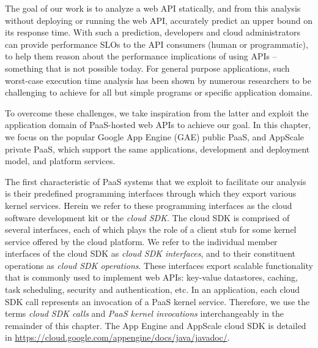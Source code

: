 The goal of our work is to analyze a web API statically, and from this analysis 
without deploying or running the web API, 
accurately predict an upper bound on its response time. With such a prediction,
developers and cloud administrators can provide performance SLOs to the API consumers (human or 
programmatic), to help them reason about 
the performance implications of using APIs -- something that is not possible today.
For general purpose applications, such worst-case execution time analysis has been shown
by numerous researchers to be challenging to achieve for all but 
simple programs or specific application domains.

To overcome these challenges, we take inspiration from the latter and exploit 
the application domain of PaaS-hosted web APIs to achieve our goal.  
In this chapter, we focus on the popular Google App Engine (GAE) public PaaS, 
and AppScale private PaaS, which support the same applications, 
development and deployment model, and platform services.

The first characteristic of PaaS systems
that we exploit to facilitate our analysis 
is their predefined programming interfaces 
through which they export various kernel services. 
Herein we refer to these programming interfaces as the cloud software development 
kit or the \textit{cloud SDK}. The cloud SDK is comprised of several interfaces, each of which
plays the role of a client stub for some kernel service offered by the cloud platform.
We refer to the individual member interfaces of the cloud SDK
as \textit{cloud SDK interfaces}, and to their constituent operations 
as \textit{cloud SDK operations}.  These interfaces export scalable
functionality that is commonly used to implement web APIs:  
key-value datastores, 
caching, task scheduling, security and authentication, etc.
In an application, each cloud SDK call represents an invocation of a PaaS kernel
service. Therefore, we use the terms \textit{cloud SDK calls} and \textit{PaaS kernel invocations}
interchangeably in the remainder of this chapter. 
The App Engine and AppScale cloud SDK is detailed 
in \url{https://cloud.google.com/appengine/docs/java/javadoc/}.


